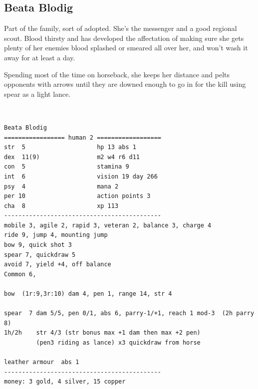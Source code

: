 \clearpage
\begin{samepage}
\subsection*{Beata Blodig}
Part of the family, sort of adopted. She's the messenger and a good regional scout. Blood thirsty and has developed the affectation of making sure she gets plenty of her enemies blood splashed or smeared all over her, and won't wash it away for at least a day.

Spending most of the time on horseback, she keeps her distance and pelts opponents with arrows until they are downed enough to go in for the kill using spear as a light lance.

\

\small \begin{verbatim}
Beata Blodig
================= human 2 ==================
str  5                    hp 13 abs 1
dex  11(9)                m2 w4 r6 d11
con  5                    stamina 9
int  6                    vision 19 day 266
psy  4                    mana 2
per 10                    action points 3
cha  8                    xp 113
--------------------------------------------
mobile 3, agile 2, rapid 3, veteran 2, balance 3, charge 4
ride 9, jump 4, mounting jump
bow 9, quick shot 3
spear 7, quickdraw 5
avoid 7, yield +4, off balance
Common 6,

bow  (1r:9,3r:10) dam 4, pen 1, range 14, str 4

spear  7 dam 5/5, pen 0/1, abs 6, parry-1/+1, reach 1 mod-3  (2h parry 8)
1h/2h    str 4/3 (str bonus max +1 dam then max +2 pen)
         (pen3 riding as lance) x3 quickdraw from horse

leather armour  abs 1
--------------------------------------------
money: 3 gold, 4 silver, 15 copper
\end{verbatim} \normalsize
\end{samepage}



